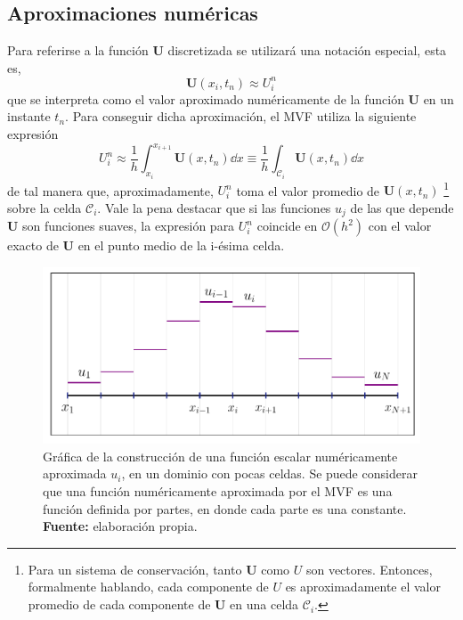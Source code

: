 \subsection{Aproximaciones numéricas}
Para referirse a la función $\mathbf{U}$ discretizada se utilizará una notación especial, esta es,
\begin{equation}
	\mathbf{U}(x_i, t_n) \approx U_{i}^{n}
\end{equation}
que se interpreta como el valor aproximado numéricamente de la función $\mathbf{U}$ en un instante $t_n$. Para conseguir dicha aproximación, el MVF utiliza la siguiente expresión
\begin{equation}
	U_{i}^{n} \approx \frac{1}{h}\int_{x_i}^{x_{i+1}}\mathbf{U}(x, t_n)\dd{x} \equiv \frac{1}{h}\int_{\mathcal{C}_i}\mathbf{U}(x, t_n)\dd{x}
\end{equation}
de tal manera que, aproximadamente, $U_i^n$ toma el valor promedio de $\mathbf{U}(x,t_n)$ \footnote{Para un sistema de conservación, tanto $\mathbf{U}$ como $U$ son vectores. Entonces, formalmente hablando, cada componente de $U$ es aproximadamente el valor promedio de cada componente de $\mathbf{U}$ en una celda $\mathcal{C}_i$.} sobre la celda $\mathcal{C}_i$. Vale la pena destacar que si las funciones $u_j$ de las que depende $\mathbf{U}$ son funciones suaves, la expresión para $U_i^n$ coincide en $\mathcal{O}(h^2)$ con el valor exacto de $\mathbf{U}$ en el punto medio de la i-ésima celda.

\begin{figure}[ht]
	\centering
	\includegraphics[width=\linewidth]{../some_plots/cap2/graficas/numeric_U.pdf}
	\caption{Gráfica de la construcción de una función escalar numéricamente aproximada $u_i$, en un dominio con pocas celdas. Se puede considerar que una función numéricamente aproximada por el MVF es una función definida por partes, en donde cada parte es una constante. \textbf{Fuente:} elaboración propia.}
	\label{fig:discretizacion-de-U}
\end{figure}

